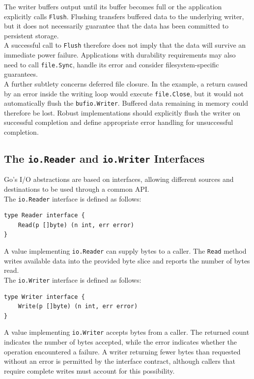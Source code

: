 The writer buffers output until its buffer becomes full or the application explicitly calls \texttt{Flush}. Flushing transfers buffered data to the underlying writer, but it does not necessarily guarantee that the data has been committed to persistent storage.\\

A successful call to \texttt{Flush} therefore does not imply that the data will survive an immediate power failure. Applications with durability requirements may also need to call \texttt{file.Sync}, handle its error and consider filesystem-specific guarantees.\\

A further subtlety concerns deferred file closure. In the example, a return caused by an error inside the writing loop would execute \texttt{file.Close}, but it would not automatically flush the \texttt{bufio.Writer}. Buffered data remaining in memory could therefore be lost. Robust implementations should explicitly flush the writer on successful completion and define appropriate error handling for unsuccessful completion.\\

\subsection{The \texttt{io.Reader} and \texttt{io.Writer} Interfaces}

Go's I/O abstractions are based on interfaces, allowing different sources and destinations to be used through a common API.\\

The \texttt{io.Reader} interface is defined as follows:

\begin{lstlisting}
type Reader interface {
    Read(p []byte) (n int, err error)
}
\end{lstlisting}

A value implementing \texttt{io.Reader} can supply bytes to a caller. The \texttt{Read} method writes available data into the provided byte slice and reports the number of bytes read.\\

The \texttt{io.Writer} interface is defined as follows:

\begin{lstlisting}
type Writer interface {
    Write(p []byte) (n int, err error)
}
\end{lstlisting}

A value implementing \texttt{io.Writer} accepts bytes from a caller. The returned count indicates the number of bytes accepted, while the error indicates whether the operation encountered a failure. A writer returning fewer bytes than requested without an error is permitted by the interface contract, although callers that require complete writes must account for this possibility.\\


